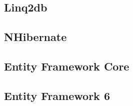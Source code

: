 \subsection{Linq2db}

\subsection{NHibernate}

\subsection{Entity Framework Core}

\subsection{Entity Framework 6}